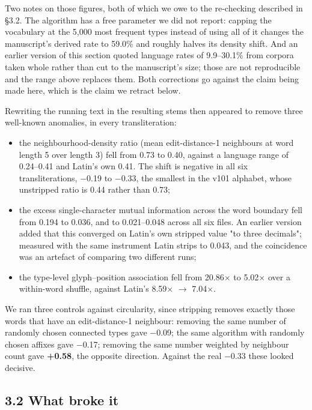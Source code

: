 \documentclass[11pt,a4paper]{article}
\begin{document}
Two notes on those figures, both of which we owe to the re-checking described in \S3.2. The algorithm has a free parameter we did not report: capping the vocabulary at the 5,000 most frequent types instead of using all of it changes the manuscript's derived rate to 59.0\% and roughly halves its density shift. And an earlier version of this section quoted language rates of 9.9--30.1\% from corpora taken whole rather than cut to the manuscript's size; those are not reproducible and the range above replaces them. Both corrections go against the claim being made here, which is the claim we retract below.


Rewriting the running text in the resulting stems then appeared to remove three well-known anomalies, in every transliteration:


\begin{itemize}\setlength\itemsep{0pt}
\item the neighbourhood-density ratio (mean edit-distance-1 neighbours at word length 5 over length 3) fell from 0.73 to 0.40, against a language range of 0.24--0.41 and Latin's own 0.41. The shift is negative in all six transliterations, $-$0.19 to $-$0.33, the smallest in the v101 alphabet, whose unstripped ratio is 0.44 rather than 0.73;
\item the excess single-character mutual information across the word boundary fell from 0.194 to 0.036, and to 0.021--0.048 across all six files. An earlier version added that this converged on Latin's own stripped value "to three decimals"; measured with the same instrument Latin strips to 0.043, and the coincidence was an artefact of comparing two different runs;
\item the type-level glyph--position association fell from 20.86$\times$ to 5.02$\times$ over a within-word shuffle, against Latin's 8.59$\times$ $\to$ 7.04$\times$.
\end{itemize}


We ran three controls against circularity, since stripping removes exactly those words that have an edit-distance-1 neighbour: removing the same number of randomly chosen connected types gave $-$0.09; the same algorithm with randomly chosen affixes gave $-$0.17; removing the same number weighted by neighbour count gave \textbf{+0.58}, the opposite direction. Against the real $-$0.33 these looked decisive.


\subsection*{3.2 What broke it}
\end{document}

